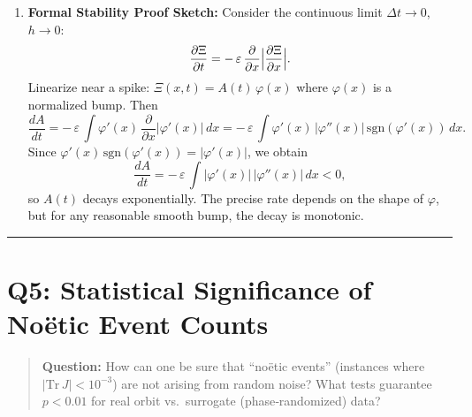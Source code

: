 \documentclass[11pt]{article}
\begin{document}
\begin{enumerate}[itemsep=0.5em]
\begin{itemize}[itemsep=0.25em]
    \end{itemize}
  \item \textbf{Formal Stability Proof Sketch:}  
    Consider the continuous limit $\Delta t\to0$, $h\to0$:
    \[
      \frac{\partial \Xi}{\partial t} = -\,\varepsilon\,\frac{\partial}{\partial x}\Bigl|\frac{\partial \Xi}{\partial x}\Bigr|.
    \]
    Linearize near a spike: $\Xi(x,t) = A(t)\,\varphi(x)$ where $\varphi(x)$ is a normalized bump. Then
    \[
      \frac{dA}{dt} 
      = -\,\varepsilon\,\int \varphi'(x)\,\frac{\partial}{\partial x}\bigl|\varphi'(x)\bigr|\,dx
      = -\,\varepsilon\,\int \varphi'(x)\,\bigl|\varphi''(x)\bigr|\,\mathrm{sgn}(\varphi'(x))\,dx.
    \]
    Since $\varphi'(x)\,\mathrm{sgn}(\varphi'(x)) = |\varphi'(x)|$, we obtain
    \[
      \frac{dA}{dt} 
      = -\,\varepsilon\,\int |\varphi'(x)|\,|\varphi''(x)|\,dx < 0,
    \]
    so $A(t)$ decays exponentially.  The precise rate depends on the shape of $\varphi$, but for any reasonable smooth bump, the decay is monotonic.  
\end{enumerate}

\vspace{1em}
\hrule

\section*{Q5: Statistical Significance of Noëtic Event Counts}
\begin{quote}
\textbf{Question:} How can one be sure that ``noëtic events'' (instances where $|\mathrm{Tr}\,J|<10^{-3}$) are not arising from random noise?  What tests guarantee $p<0.01$ for real orbit vs.\ surrogate (phase‐randomized) data?
\end{quote}
\end{document}
